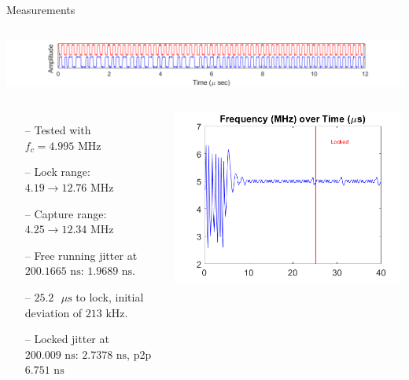 \documentclass{beamer}
\begin{document}
\begin{frame}{Measurements}
	\begin{columns}
	\vspace*{-5mm}
	\begin{flushleft}
		\includegraphics[scale=0.4125]{../impl_waveform}
	\end{flushleft}
	\end{columns}
   	\begin{columns}
    	\column{0.5\linewidth}
    	\begin{itemize}
            \item[--]
                Tested with $f_c=4.995\textrm{ MHz}$%
    		\item[--]
	    		Lock range: $4.19\rightarrow12.76\textrm{ MHz}$ 
            \item[--]
                Capture range: $4.25\rightarrow12.34\textrm{ MHz}$
            \item[--]
                Free running jitter at $200.1665\textrm{ ns}$: $1.9689\textrm{ ns}$.
            \item[--]
            	$25.2\textrm{ }\mu\textrm{s}$ to lock, initial deviation of $213\textrm{ kHz}$. 
            \item[--]
                Locked jitter at $200.009\textrm{ ns}$: $2.7378\textrm{ ns}$, p2p $6.751\textrm{ ns}$
            
        \end{itemize}
    	
    	\includegraphics[scale=0.45]{../impl_locking}
    \end{columns}
\end{frame}
\end{document}
